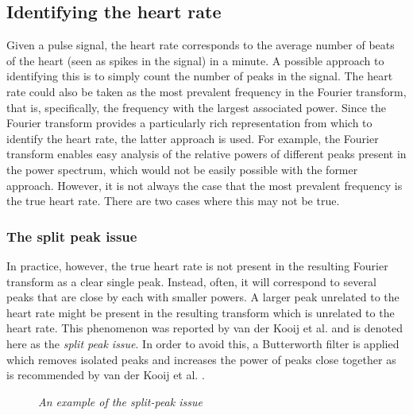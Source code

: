 \subsection{Identifying the heart rate}
Given a pulse signal, the heart rate corresponds to the average number of beats of the heart (seen as spikes in the signal) in a minute. 
A possible approach to identifying this is to simply count the number of peaks in the signal. 
The heart rate could also be taken as the most prevalent frequency in the Fourier transform, that is, specifically, the frequency with the largest associated power. 
Since the Fourier transform provides a particularly rich representation from which to identify the heart rate, the latter approach is used. 
For example, the Fourier transform enables easy analysis of the relative powers of different peaks present in the power spectrum, which would not be easily possible with the former approach.
However, it is not always the case that the most prevalent frequency is the true heart rate. There are two cases where this may not be true.

\subsubsection{The split peak issue}
In practice, however, the true heart rate is not present in the resulting Fourier transform as a clear single peak. Instead, often, it will correspond to several peaks that are close by each with smaller powers. A larger peak unrelated to the heart rate
might be present in the resulting transform which is unrelated to the heart rate. This phenomenon was reported by van der Kooij et al. \cite{vanderKooij2019} and is denoted here as the \textit{split peak issue}.
In order to avoid this, a Butterworth filter is applied which removes isolated peaks and increases the power of peaks close together as is recommended by van der Kooij et al. \cite{vanderKooij2019}.
\begin{figure}
    \centering
    \scalebox{0.6}{
    }
    \caption{\textit{An example of the split-peak issue}}
\end{figure}
